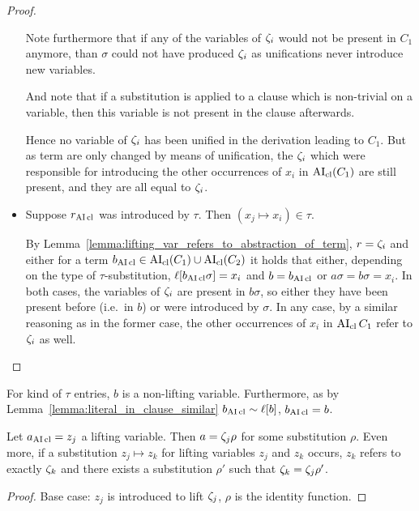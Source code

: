 \documentclass[,%
	paper=a4,%
	DIV12, %
	twoside=false,%
	liststotoc,
	bibtotoc,
	draft=false,%
	numbers=noendperiod
]{scrartcl}
\begin{document}
\begin{changebar}
\begin{proof}
\begin{itemize}
			Note furthermore that if any of the variables of $\zeta_{i}$ would not be present in $C_1$ anymore, than $\sigma$ could not have produced $\zeta_{i}$ as unifications never introduce new variables.

			And note that if a substitution is applied to a clause which is non-trivial on a variable, then this variable is not present in the clause afterwards.

			Hence no variable of $\zeta_{i}$ has been unified in the derivation leading to $C_1$. But as term are only changed by means of unification, the $\zeta_{i}$ which were responsible for introducing the other occurrences of $x_i$ in $\operatorname{AI}_\mathrm{cl}(C_1)$ are still present, and they are all equal to $\zeta_{i}$.

		\item Suppose $r_{\operatorname{AI}\mathrm{cl}}$ was introduced by $\tau$.
			Then $(x_j \mapsto x_i) \in \tau$.

			By Lemma~\ref{lemma:lifting_var_refers_to_abstraction_of_term}, $r = \zeta_{i}$ and either for a term $b_{\operatorname{AI}\mathrm{cl}}\in\operatorname{AI}_\mathrm{cl}(C_1)\cup\operatorname{AI}_\mathrm{cl}(C_2)$ it holds that either, depending on the type of $\tau$-substitution, $\ell[b_{\operatorname{AI}\mathrm{cl}}\sigma] = x_i$ and $b=b_{\operatorname{AI}\mathrm{cl}}$ or $a\sigma = b\sigma = x_i$.
			In both cases, the variables of $\zeta_{i}$ are present in $b\sigma$, so either they have been present before (i.e.\ in $b$) or were introduced by $\sigma$. In any case, by a similar reasoning as in the former case, the other occurrences of $x_i$ in $\operatorname{AI}_\mathrm{cl}{C_1}$ refer to $\zeta_{i}$ as well. 
			\qedhere
	\end{itemize}
\end{proof}

\begin{lemma}
	\label{lemma:tau_variable}
	For  kind of $\tau$ entries, $b$ is a non-lifting variable.
	Furthermore, as by Lemma~\ref{lemma:literal_in_clause_similar} $b_{\operatorname{AI}\mathrm{cl}} \sim \ell[b]$,
 $b_{\operatorname{AI}\mathrm{cl}} = b$.
\end{lemma}


\begin{lemma}
	\label{lemma:lifting_var_refers_to_abstraction_of_term}
	Let $a_{\operatorname{AI}\mathrm{cl}} = z_j$ a lifting variable. Then $a = \zeta_{j}\rho$ for some substitution $\rho$.
	Even more, if a substitution $z_j\mapsto z_k$ for lifting variables $z_j$ and $z_k$ occurs,
	$z_k$ refers to exactly $\zeta_{k}$ and there exists a substitution $\rho'$ such that $\zeta_{k} = \zeta_{j}\rho'$.
\end{lemma}
\begin{proof}
	Base case:
	$z_j$ is introduced to lift $\zeta_{j}$, $\rho$ is the identity function.


\end{proof}
\end{changebar}
\end{document}

